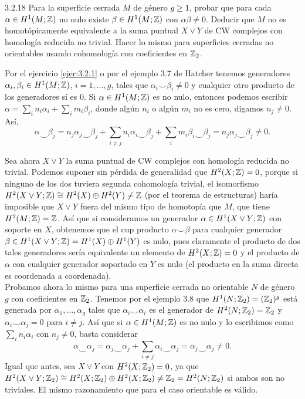 \documentclass[twoside]{article}
\begin{document}
\begin{ejercicio}{3.2.18}
Para la superficie cerrada $M$ de género $g\geq 1$, probar que para cada $\alpha\in H^1(M;\mathbb{Z})$ no nulo existe $\beta\in H^1(M;\mathbb{Z})$ con $\alpha\beta\neq 0$. Deducir que $M$ no es homotópicamente equivalente a la suma puntual $X\vee Y$ de CW complejos con homología reducida no trivial. Hacer lo mismo para superficies cerradas no orientables usando cohomología con coeficientes en $\mathbb{Z}_2$.
\end{ejercicio}
\begin{solucion}
Por el ejercicio \ref{ejer:3.2.1} o por el ejemplo 3.7 de Hatcher tenemos generadores $\alpha_i,\beta_i\in H^1(M;\mathbb{Z})$, $i=1,\dots, g$, tales que $\alpha_i\smile\beta_i\neq 0$ y cualquier otro producto de los generadores sí es 0. Si $\alpha\in H^1(M;\mathbb{Z})$ es no nulo, entonces podemos escribir $\alpha=\sum_i n_i\alpha_i+\sum_im_i\beta_i$, donde algún $n_i$ o algún $m_i$ no es cero, digamos $n_j\neq 0$. Así, $$\alpha\smile\beta_j=n_j\alpha_j\smile \beta_j +\sum_{i\neq j}n_i\alpha_i\smile\beta_j+\sum_{i}m_i\beta_i\smile\beta_j=n_j\alpha_j\smile\beta_j\neq 0.$$

Sea ahora $X\vee Y$ la suma puntual de CW complejos con homología reducida no trivial. Podemos suponer sin pérdida de generalidad que $H^2(X;\mathbb{Z})=0$, porque si ninguno de los dos tuviera segunda cohomología trivial, el isomorfismo $H^2(X\vee Y;\mathbb{Z})\cong H^2(X)\oplus H^2(Y)\neq \mathbb{Z}$ (por el teorema de estructuras) haría imposible que $X\vee Y$ fuera del mismo tipo de homotopía que $M$, que tiene $H^2(M;\mathbb{Z})=\mathbb{Z}$. Así que si consideramos un generador $\alpha\in H^1(X\vee Y;\mathbb{Z})$ con soporte en $X$, obtenemos que el cup producto $\alpha\smile\beta$ para cualquier generador $\beta\in H^1(X\vee Y;\mathbb{Z})=H^1(X)\oplus H^1(Y)$ es nulo, pues claramente el producto de dos tales generadores sería equivalente un elemento de $H^2(X;\mathbb{Z})=0$ y el producto de $\alpha$ con cualquier generador soportado en $Y$ es nulo (el producto en la suma directa es coordenada a coordenada).\\

Probamos ahora lo mismo para una superficie cerrada no orientable $N$ de género $g$ con coeficientes en $\mathbb{Z}_2$. Tenemos por el ejemplo 3.8 que $H^1(N;\mathbb{Z}_2) =(\mathbb{Z}_2)^g$ está generada por $\alpha_1,\dots,\alpha_g$ tales que $\alpha_i\smile\alpha_i$ es el generador de $H^2(N;\mathbb{Z}_2)=\mathbb{Z}_2$ y $\alpha_i\smile\alpha_j=0$ para $i\neq j$. Así que si $\alpha\in H^1(M;\mathbb{Z})$ es no nulo y lo escribimos como $\sum_i n_i\alpha_i$ con $n_j\neq 0$, basta considerar
\[
\alpha\smile\alpha_j=\alpha_j\smile\alpha_j+\sum_{i\neq j}\alpha_i\smile\alpha_j=\alpha_j\smile\alpha_j\neq 0.
\]
Igual que antes, sea $X\vee Y$ con $H^2(X;\mathbb{Z}_2)=0$, ya que $H^2(X\vee Y;\mathbb{Z}_2)\cong H^2(X;\mathbb{Z}_2)\oplus H^2(X;\mathbb{Z}_2)\neq \mathbb{Z}_2=H^2(N;\mathbb{Z}_2)$ si ambos son no triviales. El mismo razonamiento que para el caso orientable es válido. 
\end{solucion}
\end{document}
